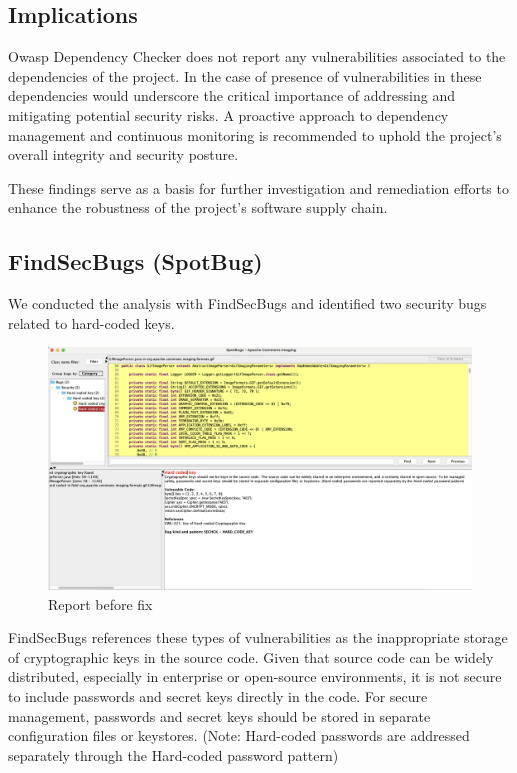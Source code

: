 \documentclass[sigconf]{acmart}
\begin{document}
\subsection{Implications}

Owasp Dependency Checker does not report any vulnerabilities associated to the dependencies of the project. In the case of presence of vulnerabilities in these dependencies would underscore the critical importance of addressing and mitigating potential security risks. A proactive approach to dependency management and continuous monitoring is recommended to uphold the project's overall integrity and security posture.

These findings serve as a basis for further investigation and remediation efforts to enhance the robustness of the project's software supply chain.


\subsection{FindSecBugs (SpotBug)}

We conducted the analysis with FindSecBugs and identified two security bugs related to hard-coded keys. 

\begin{figure}[h!]
    \centering
    \includegraphics[width=1\linewidth]{reportFindSecBugs.png}
    \caption{Report before fix}
    \label{fig:enter-label}
\end{figure}

FindSecBugs references these types of vulnerabilities as the inappropriate storage of cryptographic keys in the source code. Given that source code can be widely distributed, especially in enterprise or open-source environments, it is not secure to include passwords and secret keys directly in the code. For secure management, passwords and secret keys should be stored in separate configuration files or keystores. (Note: Hard-coded passwords are addressed separately through the Hard-coded password pattern)
\end{document}

